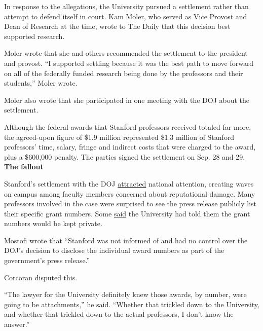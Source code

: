 \documentclass{article}%
\begin{document}
\par{In response to the allegations, the University pursued a settlement rather than attempt to defend itself in court. Kam Moler, who served as Vice Provost and Dean of Research at the time, wrote to The Daily that this decision best supported research.}\\
\par{Moler wrote that she and others recommended the settlement to the president and provost. “I supported settling because it was the best path to move forward on all of the federally funded research being done by the professors and their students,” Moler wrote. }\\
\par{Moler also wrote that she participated in one meeting with the DOJ about the settlement.}\\
\par{Although the federal awards that Stanford professors received totaled far more, the agreed-upon figure of \$1.9 million represented \$1.3 million of Stanford professors’ time, salary, fringe and indirect costs that were charged to the award, plus a \$600,000 penalty. The parties signed the settlement on Sep. 28 and 29.}\\
\textbf{The fallout}
\par{Stanford’s settlement with the DOJ \href{https://thehill.com/opinion/national-security/4246080-stanfords-settlement-with-doj-shows-how-deep-china-has-its-claws-in-our-universities/}{attracted} national attention, creating waves on campus among faculty members concerned about reputational damage. Many professors involved in the case were surprised to see the press release publicly list their specific grant numbers. Some \href{https://stanforddaily.com/2023/10/27/professors-raise-questions-over-1-9-million-stanford-doj-settlement/}{said} the University had told them the grant numbers would be kept private.}\\
\par{Mostofi wrote that “Stanford was not informed of and had no control over the DOJ’s decision to disclose the individual award numbers as part of the government’s press release.” }\\
\par{Corcoran disputed this.}\\
\par{“The lawyer for the University definitely knew those awards, by number, were going to be attachments,” he said. “Whether that trickled down to the University, and whether that trickled down to the actual professors, I don’t know the answer.” }\\
\end{document}

